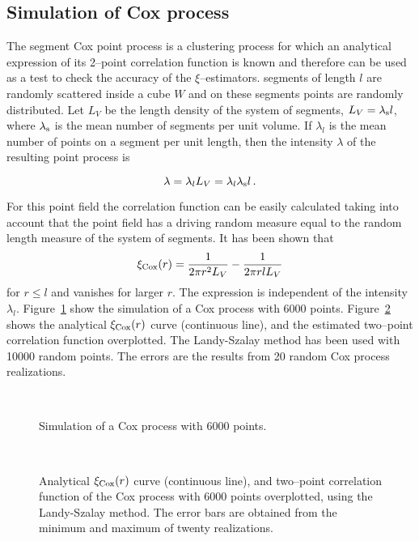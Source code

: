 \subsection{Simulation of Cox process}

The segment Cox point process \cite{cf:pons99} is a clustering process
for which an analytical expression of its 2--point correlation
function is known and therefore can be used as a test to check the
accuracy of the $\xi$--estimators.  segments of length $l$ are
randomly scattered inside a cube $W$ and on these segments points are
randomly distributed.  Let $L_V$ be the length density of the system
of segments, $L_V=\lambda_{\rm{s}}l$, where $\lambda_{\rm{s}}$ is the
mean number of segments per unit volume. If $\lambda_l$ is the mean
number of points on a segment per unit length, then the intensity
$\lambda$ of the resulting point process is

\begin{equation}
\lambda=\lambda_lL_V=\lambda_l\lambda_{\rm{s}}l\,.
\end{equation}

For this point field the correlation function can be easily calculated
taking into account that the point field has a driving random measure
equal to the random length measure of the system of segments. It has
been shown \cite{cf:stoyan95} that
  \begin{equation}
\xi_{\rm {Cox}}(r)=\frac{1}{2\pi r^2L_V}-\frac{1}{2\pi rlL_V} \label{skm}
\end{equation}
for $r \le l$ and vanishes for larger $r$. The expression is
independent of the intensity $\lambda_l$.  Figure~\ref{fig_cox_cube}
show the simulation of a Cox process with 6000 points.
Figure~\ref{fig_cox_curve} shows the analytical $\xi_{\rm {Cox}}(r)$
curve (continuous line), and the estimated two--point correlation
function overplotted. The Landy-Szalay method has been used with 10000
random points. The errors are the results from 20 random Cox process
realizations.
 
\begin{figure}[htb]
\centerline{
\hbox{
}}
\caption{Simulation of a Cox process with 6000 points.}
\label{fig_cox_cube}
\end{figure}

\begin{figure}[htb]
\centerline{
\hbox{
}}
\caption{Analytical $\xi_{\rm {Cox}}(r)$ curve (continuous line), and
  two--point correlation function of the Cox process with 6000 points
  overplotted, using the Landy-Szalay method.  The error bars are
  obtained from the minimum and maximum of twenty realizations.}
\label{fig_cox_curve}
\end{figure}


